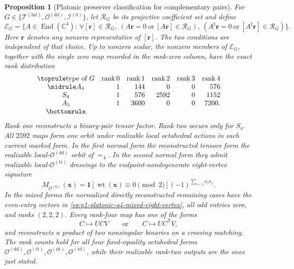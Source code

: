 \documentclass[11pt,letterpaper,onecolumn]{article}
\theoremstyle{plain}
\newtheorem{proposition}[proposition]{Proposition}
\theoremstyle{definition}
\theoremstyle{remark}
\newcommand{\TetInt}{{\mathcal T^{(\mathrm{int})}}}
\newcommand{\OctDD}{{\mathcal O^{(\mathrm{dd})}}}
\newcommand{\OctTT}{{\mathcal O^{(\mathrm{tt})}}}
\newcommand{\OctDT}{{\mathcal O^{(\mathrm{dt})}}}
\newcommand{\OctTD}{{\mathcal O^{(\mathrm{td})}}}
\newcommand{\IcoZero}{{\mathcal I^{(0)}}}
\newcommand{\rank}{\operatorname{rank}}
\newcommand{\wt}{\operatorname{wt}}
\newcommand{\Eq}{=}
\newcommand{\one}{\mathbf 1}
\begin{document}
\begin{proposition}[Platonic preserver classification for complementary pairs]
\label{prop:cert-platonic-q4-preservers}
For \(G\in\{\TetInt,\OctDD,\IcoZero\}\), let \(\mathcal R_G\) be its
projective coefficient set and define
\begin{equation}
 \mathscr E_G=
 \{A\in\operatorname{End}(\mathbb C^4):
   \ \forall[{\mathbf{r}}]\in\mathcal R_G,\ 
   (A{\mathbf{r}}=0\ \text{or}\ [A{\mathbf{r}}]\in\mathcal R_G),\
   (A^\sharp {\mathbf{r}}=0\ \text{or}\ [A^\sharp {\mathbf{r}}]\in\mathcal R_G)\}.
 \label{eq:cert-q4-two-sided-endomorphisms}
\end{equation}
Here \({\mathbf{r}}\) denotes any nonzero representative of \([{\mathbf{r}}]\). The two
conditions are independent of that choice.
Up to nonzero scalar, the nonzero members of \(\mathscr E_G\), together
with the single zero map recorded in the rank-zero column, have the exact
rank distribution
\begin{equation}
\begin{array}{crrrrr}
\toprule
\text{type of }G&\rank0&\rank1&\rank2&\rank3&\rank4\\ \midrule
A_4&1&144&0&0&576\\
S_4&1&576&2592&0&1152\\
A_5&1&3600&0&0&7200.\\
\bottomrule
\end{array}
\label{eq:cert-q4-preserver-counts}
\end{equation}
Rank one reconstructs a binary-pair tensor factor.  Rank two occurs only
for \(S_4\). All \(2592\) maps form one orbit under realizable local
octahedral actions in each current marked form.  In the first normal form the reconstructed tensors
form the realizable local-\(\OctDD\) orbit of \(\Eq_4\). In the second
normal form they admit realizable local-\(\OctTT\) dressings to the endpoint-nondegenerate eight-vertex signature
\[
  M_{\OctTT}({\mathbf{x}})=
  \one[\wt({\mathbf{x}})\equiv0\pmod2](-1)^{\sum_{i<j}x_ix_j}.
\]
In the mixed forms the normalized directly reconstructed remaining cases have
the even-entry vectors in
\cref{eq:p1-platonic-q4-mixed-eight-vertex}, all odd entries zero, and
ranks \((2,2,2)\).
Every rank-four map has one of
the forms
\begin{equation}
  C\longmapsto UCV
  \qquad\text{or}\qquad
  C\longmapsto UC^{\mathsf T}V,
  \label{eq:cert-q4-full-rank-preservers}
\end{equation}
and reconstructs a product of two nonsingular binaries on a crossing
matching.  The rank counts hold for all four fixed-equality octahedral
forms \(\OctDD,\OctTT,\OctDT,\OctTD\), while
their realizable rank-two outputs are the ones just stated.
\end{proposition}
\end{document}
